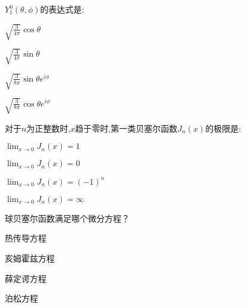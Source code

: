 \documentclass{njustexam}
\begin{document}
\begin{problem}
  $Y_{1}^{0}(\theta, \phi)$的表达式是:
\begin{abcd}
  \item $\sqrt{\frac{3}{4\pi}} \cos \theta$
  \item $\sqrt{\frac{3}{4\pi}} \sin \theta$
  \item $\sqrt{\frac{3}{8\pi}} \sin \theta e^{i\phi}$
  \item $\sqrt{\frac{3}{8\pi}} \cos \theta e^{i\phi}$
\end{abcd}
\end{problem}



\begin{problem}
  对于$n$为正整数时,$x$趋于零时,第一类贝塞尔函数$J_n(x)$的极限是:

  \begin{abcd}
\item $\lim_{x \to 0} J_n(x) = 1$

\item $\lim_{x \to 0} J_n(x) = 0$

\item $\lim_{x \to 0} J_n(x) = (-1)^n$

\item $\lim_{x \to 0} J_n(x) = \infty$
 \end{abcd}
\end{problem}


\begin{problem}
  球贝塞尔函数满足哪个微分方程？ 

  \begin{abcd}
    \item 热传导方程
    \item 亥姆霍兹方程
    \item 薛定谔方程
    \item 泊松方程
  \end{abcd}
\end{problem}
\end{document}
